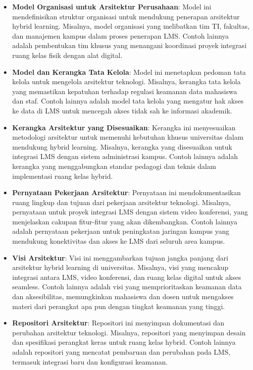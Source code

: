 \begin{itemize}
	\item \textbf{Model Organisasi untuk Arsitektur Perusahaan}: Model ini mendefinisikan struktur organisasi untuk mendukung penerapan arsitektur hybrid learning. Misalnya, model organisasi yang melibatkan tim TI, fakultas, dan manajemen kampus dalam proses penerapan LMS. Contoh lainnya adalah pembentukan tim khusus yang menangani koordinasi proyek integrasi ruang kelas fisik dengan alat digital.
	
	\item \textbf{Model dan Kerangka Tata Kelola}: Model ini menetapkan pedoman tata kelola untuk mengelola arsitektur teknologi. Misalnya, kerangka tata kelola yang memastikan kepatuhan terhadap regulasi keamanan data mahasiswa dan staf. Contoh lainnya adalah model tata kelola yang mengatur hak akses ke data di LMS untuk mencegah akses tidak sah ke informasi akademik.
	
	\item \textbf{Kerangka Arsitektur yang Disesuaikan}: Kerangka ini menyesuaikan metodologi arsitektur untuk memenuhi kebutuhan khusus universitas dalam mendukung hybrid learning. Misalnya, kerangka yang disesuaikan untuk integrasi LMS dengan sistem administrasi kampus. Contoh lainnya adalah kerangka yang menggabungkan standar pedagogi dan teknis dalam implementasi ruang kelas hybrid.
	
	\item \textbf{Pernyataan Pekerjaan Arsitektur}: Pernyataan ini mendokumentasikan ruang lingkup dan tujuan dari pekerjaan arsitektur teknologi. Misalnya, pernyataan untuk proyek integrasi LMS dengan sistem video konferensi, yang menjelaskan cakupan fitur-fitur yang akan dikembangkan. Contoh lainnya adalah pernyataan pekerjaan untuk peningkatan jaringan kampus yang mendukung konektivitas dan akses ke LMS dari seluruh area kampus.
	
	\item \textbf{Visi Arsitektur}: Visi ini menggambarkan tujuan jangka panjang dari arsitektur hybrid learning di universitas. Misalnya, visi yang mencakup integrasi antara LMS, video konferensi, dan ruang kelas digital untuk akses seamless. Contoh lainnya adalah visi yang memprioritaskan keamanan data dan aksesibilitas, memungkinkan mahasiswa dan dosen untuk mengakses materi dari perangkat apa pun dengan tingkat keamanan yang tinggi.
	
	\item \textbf{Repositori Arsitektur}: Repositori ini menyimpan dokumentasi dan perubahan arsitektur teknologi. Misalnya, repositori yang menyimpan desain dan spesifikasi perangkat keras untuk ruang kelas hybrid. Contoh lainnya adalah repositori yang mencatat pembaruan dan perubahan pada LMS, termasuk integrasi baru dan konfigurasi keamanan.
	

\end{itemize}
